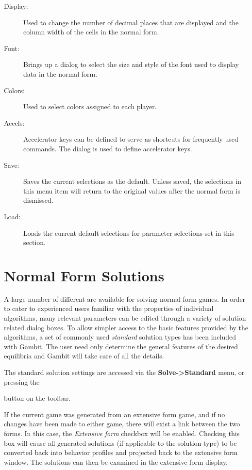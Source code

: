 \documentclass[12pt]{report}
\begin{document}
\begin{description}
\item[Display:] Used to change the number of decimal places that are displayed and the column width of the cells in the normal form.  
\item[Font:] Brings up a dialog to select the size and style of the font used to display data in the normal form.  
\item[Colors:] Used to select colors assigned to each player.
\item[Accels:] Accelerator keys can be defined to serve as
shortcuts for frequently used commands.  The   dialog is used to define accelerator keys. 
\item[Save:] Saves the current selections as the default.  Unless
saved, the selections in this menu item will return to the original
values after the normal form is dismissed.
\item[Load:] Loads the current default selections for parameter
selections set in this section.
\end{description}

\section{Normal Form Solutions}\label{NormalFormSolutions}
A large number of different  
are available for solving normal form games.  In order to cater to
experienced users familiar with the properties of individual
algorithms, many relevant parameters can be edited through a variety
of solution related dialog boxes.  To allow simpler access to the
basic features provided by the algorithms, a set of commonly used {\em
standard} solution types has been included with Gambit.  The user need
only determine the general features of the desired equilibria and
Gambit will take care of all the details.

The standard solution settings are accessed via the {\bf 
Solve->Standard} menu, or pressing the
\begin{figure}
\end{figure}
 button on the toolbar.

If the current game was generated from an extensive form game, and if no
changes have been made to either game, there will exist a link between the
two forms.  In this case, the {\em Extensive form} checkbox will be
enabled.  Checking this box will cause all generated solutions (if
applicable to the solution type) to be converted back into behavior
profiles and projected back to the extensive form window.  The solutions
can then be examined in the extensive form display.
\end{document}
